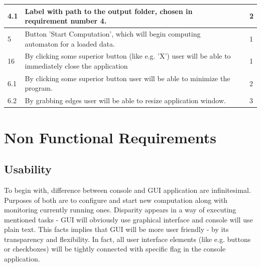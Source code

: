 \documentclass{article}
\begin{document}
\begin{center}
\begin{longtable}{| l | p{4cm} | p{3.5cm} | l |}
		4.1 & 
		Label with path to the output folder, chosen in requirement number 4. & 
		 &
		2 
		\\ \hline		
		

		5 & 
		Button 'Start Computation', which will begin computing automaton for a loaded data. & 
		 &
		1
		\\ \hline		


		16 & 
		By clicking some superior button (like e.g. 'X') user will be able to immediately 				close the application & 
		 &
		1
		\\ \hline
	
		6.1 & 
		By clicking some superior button user will be able to minimize the program. & 
		 &
		2
		\\ \hline	

		6.2 & 
		By grabbing edges user will be able to resize application window. & 
		 &
		3
		\\ \hline
		
	\end{longtable}
\end{center}	



\newpage

%
%
\section{Non Functional Requirements}


%
%
\subsection{Usability} \label{usability}
To begin with, difference between console and GUI application are infinitesimal. Purposes of both are to configure and start new computation along with monitoring currently running ones.
Disparity appears in a way of executing mentioned tasks - GUI will obviously use graphical interface and console will use plain text. This facts implies that GUI will be more user friendly - by its transparency and flexibility. In fact, all user interface elements (like e.g. buttons or checkboxes) will be tightly connected with specific flag in the console application.

\end{document}
